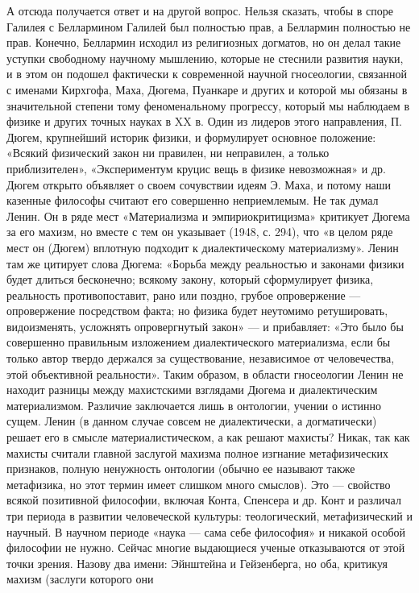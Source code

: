 А отсюда получается ответ и на другой вопрос. Нельзя сказать, чтобы в споре
Галилея с Беллармином Галилей был полностью прав, а Беллармин полностью не
прав. Конечно, Беллармин исходил из религиозных догматов, но он делал такие
уступки свободному научному мышлению, которые не стеснили развития науки, и в
этом он подошел фактически к современной научной гносеологии, связанной с
именами Кирхгофа, Маха, Дюгема, Пуанкаре и других и которой мы обязаны в
значительной степени тому феноменальному прогрессу, который мы наблюдаем в
физике и других точных науках в XX в. Один из лидеров этого направления, П.
Дюгем, крупнейший историк физики, и формулирует основное положение: «Всякий
физический закон ни правилен, ни неправилен, а только приблизителен»,
«Экспериментум круцис вещь в физике невозможная» и др. Дюгем открыто объявляет
о своем сочувствии идеям Э. Маха, и потому наши казенные философы считают его
совершенно неприемлемым. Не так думал Ленин. Он в ряде мест «Материализма и
эмпириокритицизма» критикует Дюгема за его махизм, но вместе с тем он указывает
(1948, с. 294), что «в целом ряде мест он (Дюгем) вплотную подходит к
диалектическому материализму». Ленин там же цитирует слова Дюгема: «Борьба
между реальностью и законами физики будет длиться бесконечно; всякому закону,
который сформулирует физика, реальность противопоставит, рано или поздно,
грубое опровержение --- опровержение посредством факта; но физика будет неутомимо
ретушировать, видоизменять, усложнять опровергнутый закон» --- и прибавляет: «Это
было бы совершенно правильным изложением диалектического материализма, если бы
только автор твердо держался за существование, независимое от человечества,
этой объективной реальности». Таким образом, в области гносеологии Ленин не
находит разницы между махистскими взглядами Дюгема и диалектическим
материализмом. Различие заключается лишь в онтологии, учении о истинно сущем.
Ленин (в данном случае совсем не диалектически, а догматически) решает его в
смысле материалистическом, а как решают махисты? Никак, так как махисты считали
главной заслугой махизма полное изгнание метафизических признаков, полную
ненужность онтологии (обычно ее называют также метафизика, но этот термин имеет
слишком много смыслов). Это --- свойство всякой позитивной философии, включая
Конта, Спенсера и др. Конт и различал три периода в развитии человеческой
культуры: теологический, метафизический и научный. В научном периоде «наука ---
сама себе философия» и никакой особой философии не нужно. Сейчас многие
выдающиеся ученые отказываются от этой точки зрения. Назову два имени:
Эйнштейна и Гейзенберга, но оба, критикуя махизм (заслуги которого они
